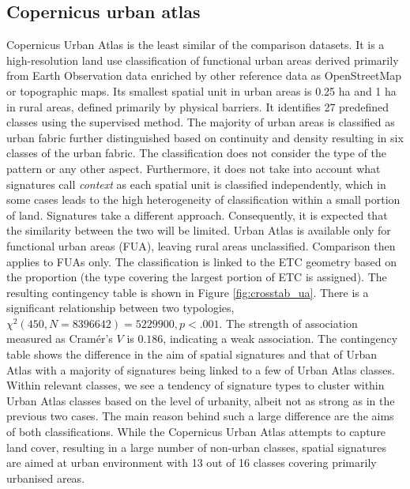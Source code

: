 \documentclass[fleqn,10pt]{wlscirep}
\begin{document}
\subsection*{Copernicus urban atlas}
Copernicus Urban Atlas is the least similar of the comparison datasets. It is a
high-resolution land use classification of functional urban areas derived primarily from
Earth Observation data enriched by other reference data as OpenStreetMap or topographic
maps. Its smallest spatial unit in urban areas is 0.25 ha and 1 ha in rural areas,
defined primarily by physical barriers. It identifies
27 predefined classes using the supervised method.
The majority of urban areas is classified as urban fabric further distinguished based on
continuity and density resulting in six classes of the urban fabric. The classification does
not consider the type of the pattern or any other aspect. Furthermore, it does not take
into account what signatures call \textit{context} as each spatial unit is
classified independently, which in some cases leads to the high heterogeneity of
classification within a small portion of land. Signatures take a different approach.
Consequently, it is expected that the similarity between the two will be limited.
Urban Atlas is available only for functional urban areas (FUA), leaving rural areas
unclassified. Comparison then applies to FUAs only. The classification is linked to the
ETC geometry based on the proportion (the type covering the largest portion of ETC is
assigned). The resulting contingency table is shown in Figure \ref{fig:crosstab_ua}. There is a
significant relationship between two typologies, $\chi^{2} (450, N = 8396642) = 5229900,
p < .001$. The strength of association measured as Cramér's $V$ is $0.186$, indicating
a weak association. The contingency table shows the difference in the aim of spatial
signatures and that of Urban Atlas with a majority of signatures being linked to a few
of Urban Atlas classes. Within relevant classes, we see a tendency of signature types to
cluster within Urban Atlas classes based on the level of urbanity, albeit not as strong
as in the previous two cases.
The main reason behind such a large difference are the aims of both classifications. While
the Copernicus Urban Atlas attempts to capture land cover, resulting in a large number
of non-urban classes, spatial signatures are aimed at urban environment with 13 out of 16
classes covering primarily urbanised areas.
\end{document}
